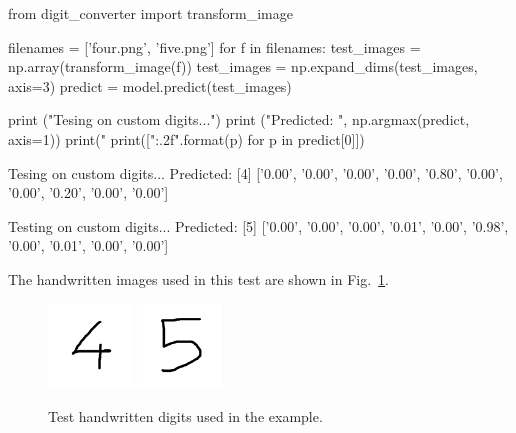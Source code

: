 \begin{ipython}
from digit_converter import transform_image

filenames = ['four.png', 'five.png']
for f in filenames:
    test_images = np.array(transform_image(f))
test_images = np.expand_dims(test_images, axis=3)
predict = model.predict(test_images)

print ("Tesing on custom digits...")
print ("Predicted: ", np.argmax(predict, axis=1))
print("%
print(["{:.2f}".format(p) for p in predict[0]])
\end{ipython}
\begin{ioutput}
Tesing on custom digits...
Predicted:  [4]
['0.00', '0.00', '0.00', '0.00', '0.80', '0.00', '0.00', '0.20', '0.00', 
'0.00']

Testing on custom digits...
Predicted:  [5]
['0.00', '0.00', '0.00', '0.01', '0.00', '0.98', '0.00', '0.01', '0.00', 
'0.00']
\end{ioutput}
The handwritten images used in this test are shown in Fig.~\ref{fig:test_images}.

\begin{figure}[htb]
\centering
\includegraphics[width=0.2\textwidth]{figures/four.png}
\includegraphics[width=0.2\textwidth]{figures/five.png}
\caption{Test handwritten digits used in the example.}
\label{fig:test_images}
\end{figure}

